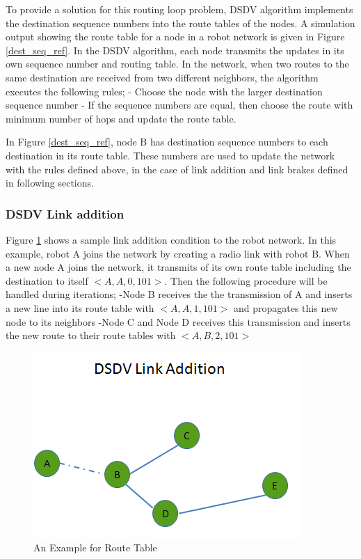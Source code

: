 To provide a solution for this routing loop problem, DSDV algorithm implements the destination sequence numbers into the route tables of the nodes. A simulation output showing the route table for a node in a robot network is given in Figure \ref{dest_seq_ref}. In the DSDV algorithm, each node transmits the updates in its own sequence number and routing table. In the network, when two routes to the same destination are received from two different neighbors, the algorithm executes the following rules;\newline
	- Choose the node with the larger destination sequence number \newline
	- If the sequence numbers are equal, then choose the route with minimum number of hops and update the route table.

In Figure \ref{dest_seq_ref}, node B has destination sequence numbers to each destination in its route table. These numbers are used to update the network with the rules defined above, in the case of link addition and link brakes defined in following sections.
	
\subsubsection{DSDV Link addition}

Figure \ref{linkk_addition} shows a sample link addition condition to the robot network. In this example, robot A joins the network by creating a radio link with robot B. When a new node A joins the network, it transmits of its own route table including the destination to itself $<A,A,0,101>$. Then the following procedure will be handled during iterations; \newline
	-Node B receives the the transmission of A and inserts a new line into its route table with $<A,A,1,101>$ and propagates this new node to its neighbors \newline
	-Node C and Node D receives this transmission and inserts the new route to their route tables with $<A,B,2,101>$

\begin{figure}[H]
\caption{An Example for Route Table} \label{linkk_addition}
\centering
\includegraphics[scale = 0.65]{link_add}
\end{figure}	
		

